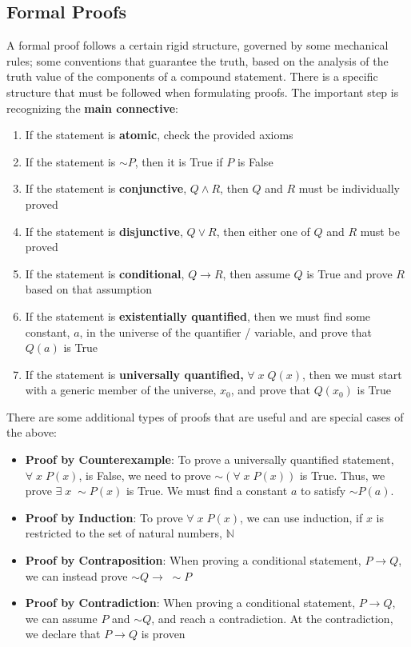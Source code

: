 \documentclass[11pt]{article}
\newcommand{\N}{\mathbb{N}}
\begin{document}
\subsection{Formal Proofs}
A formal proof follows a certain rigid structure, governed by some mechanical rules; some conventions that guarantee the truth, based on the analysis of the truth value of the components of a compound statement. There is a specific structure that must be followed when formulating proofs.  The important step is recognizing the \textbf{main connective}:
\begin{enumerate}
\item If the statement is \textbf{atomic}, check the provided axioms
\item If the statement is $ \sim P$, then it is True if $P$ is False
\item If the statement is \textbf{conjunctive}, $Q \land R$, then $Q$ and $R$ must be individually proved
\item If the statement is \textbf{disjunctive}, $Q \lor R$, then either one of $Q$ and $R$ must be proved 
\item If the statement is \textbf{conditional}, $Q \rightarrow R$, then assume $Q$ is True and prove $R$ based on that assumption
\item If the statement is \textbf{existentially quantified}, then we must find  some constant, $a$, in the universe of the quantifier / variable, and prove that $Q(a)$ is True 
\item If the statement is \textbf{universally quantified,}  $\forall \; x \; Q(x)$,  then we must start with a generic member of the universe, $x_0$, and prove that $Q(x_0)$ is True
\end{enumerate}
\pagebreak
There are some additional types of proofs that are useful and are special cases of the above: 
\begin{itemize}
\item \textbf{Proof by Counterexample}: To prove a universally quantified statement, $\forall \; x \; P(x)$, is False, we need to prove $\sim (\forall \; x \; P(x))$ is True. Thus, we prove $ \exists \; x \; \sim P(x)$ is True.  We must find a constant $a$ to satisfy $ \sim P(a)$. 
\item \textbf{Proof by Induction}: To prove $\forall \; x \; P(x)$, we can use induction, if $x$ is restricted to the set of natural numbers,  $\N$
\item \textbf{Proof by Contraposition}: When proving a conditional statement, $P \rightarrow Q$, we can instead prove $ \sim Q \rightarrow \; \sim P$
\item \textbf{Proof by Contradiction}: When proving a conditional statement, $P \rightarrow Q$, we can assume $P$ and $\sim Q$, and reach a contradiction.  At the contradiction, we declare that $P \rightarrow Q$ is proven
 \end{itemize}
\end{document}
